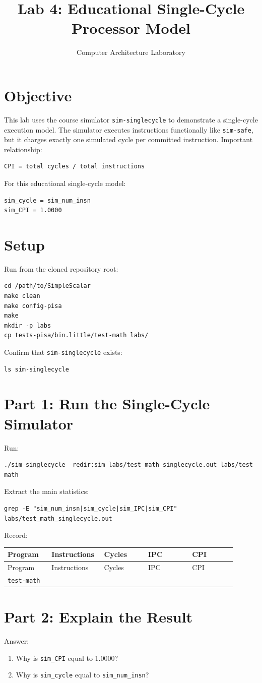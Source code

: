 \documentclass[11pt]{article}
\title{Lab 4: Educational Single-Cycle Processor Model}
\author{Computer Architecture Laboratory}
\date{}
\begin{document}
\maketitle
\section{Objective}
This lab uses the course simulator \texttt{sim-singlecycle} to demonstrate a single-cycle execution model. The simulator executes instructions functionally like \texttt{sim-safe}, but it charges exactly one simulated cycle per committed instruction.
Important relationship:
\begin{lstlisting}
CPI = total cycles / total instructions
\end{lstlisting}
For this educational single-cycle model:
\begin{lstlisting}
sim_cycle = sim_num_insn
sim_CPI = 1.0000
\end{lstlisting}
\section{Setup}
Run from the cloned repository root:
\begin{lstlisting}
cd /path/to/SimpleScalar
make clean
make config-pisa
make
mkdir -p labs
cp tests-pisa/bin.little/test-math labs/
\end{lstlisting}
Confirm that \texttt{sim-singlecycle} exists:
\begin{lstlisting}
ls sim-singlecycle
\end{lstlisting}
\section{Part 1: Run the Single-Cycle Simulator}
Run:
\begin{lstlisting}
./sim-singlecycle -redir:sim labs/test_math_singlecycle.out labs/test-math
\end{lstlisting}
Extract the main statistics:
\begin{lstlisting}
grep -E "sim_num_insn|sim_cycle|sim_IPC|sim_CPI" labs/test_math_singlecycle.out
\end{lstlisting}
Record:
\begin{center}
\scriptsize
\begin{longtable}{|p{0.18\linewidth}|p{0.18\linewidth}|p{0.18\linewidth}|p{0.18\linewidth}|p{0.18\linewidth}|}
\hline
Program & Instructions & Cycles & IPC & CPI \\
\hline
\endfirsthead
\hline
Program & Instructions & Cycles & IPC & CPI \\
\hline
\endhead
\texttt{test-math} &  &  &  &  \\
\hline
\end{longtable}
\normalsize
\end{center}
\section{Part 2: Explain the Result}
Answer:
\begin{enumerate}
\item Why is \texttt{sim\_CPI} equal to 1.0000?
\item Why is \texttt{sim\_cycle} equal to \texttt{sim\_num\_insn}?
\end{enumerate}
\end{document}
